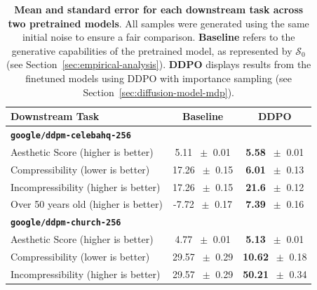 \begin{table}
\centering
\begin{tabular}{lcc}
\toprule
\textbf{Downstream Task} & \textbf{Baseline} & \textbf{DDPO} \\
\midrule
\textbf{\texttt{google/ddpm-celebahq-256}} & & \\
\quad Aesthetic Score (higher is better) & 5.11 $~\pm$ 0.01 & \textbf{5.58} $~\pm$ 0.01 \\
\quad Compressibility (lower is better) & 17.26 $~\pm$  0.15 & \textbf{6.01} $~\pm$ 0.13 \\
\quad Incompressibility (higher is better) & 17.26 $~\pm$ 0.15 & \textbf{21.6} $~\pm$ 0.12 \\
\quad Over 50 years old (higher is better) & -7.72 $~\pm$ 0.17 & \textbf{7.39} $~\pm$ 0.16 \\
\hline
\textbf{\texttt{google/ddpm-church-256}} & & \\
\quad Aesthetic Score (higher is better) & 4.77 $~\pm$ 0.01 & \textbf{5.13} $~\pm$ 0.01  \\
\quad Compressibility (lower is better) & 29.57 $~\pm$  0.29 & \textbf{10.62} $~\pm$ 0.18  \\
\quad Incompressibility (higher is better) & 29.57 $~\pm$ 0.29 & \textbf{50.21} $~\pm$ 0.34  \\
\bottomrule
\end{tabular}
\captionsetup{width=\textwidth} %
\caption{\textbf{Mean and standard error for each downstream task across two pretrained models}. All samples were generated using the same initial noise to ensure a fair comparison. \textbf{Baseline} refers to the generative capabilities of the pretrained model, as represented by $\mathcal{S}_{0}$ (see Section~\ref{sec:empirical-analysis}). \textbf{DDPO} displays results from the finetuned models using DDPO with importance sampling (see Section~\ref{sec:diffusion-model-mdp}).}
\label{tab:reward-results}
\end{table}


